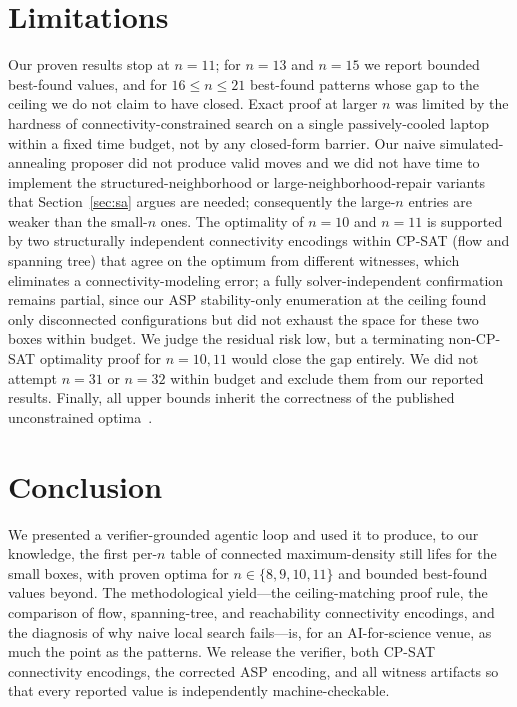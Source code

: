 \documentclass{article}
\begin{document}
\section{Limitations}
\label{sec:limitations}
Our proven results stop at $n=11$; for $n=13$ and $n=15$ we report bounded best-found values, and for $16\le n\le 21$ best-found patterns whose gap to the ceiling we do not claim to have closed. Exact proof at larger $n$ was limited by the hardness of connectivity-constrained search on a single passively-cooled laptop within a fixed time budget, not by any closed-form barrier. Our naive simulated-annealing proposer did not produce valid moves and we did not have time to implement the structured-neighborhood or large-neighborhood-repair variants that Section~\ref{sec:sa} argues are needed; consequently the large-$n$ entries are weaker than the small-$n$ ones. The optimality of $n=10$ and $n=11$ is supported by two structurally independent connectivity encodings within CP-SAT (flow and spanning tree) that agree on the optimum from different witnesses, which eliminates a connectivity-modeling error; a fully solver-independent confirmation remains partial, since our ASP stability-only enumeration at the ceiling found only disconnected configurations but did not exhaust the space for these two boxes within budget. We judge the residual risk low, but a terminating non-CP-SAT optimality proof for $n=10,11$ would close the gap entirely. We did not attempt $n=31$ or $n=32$ within budget and exclude them from our reported results. Finally, all upper bounds inherit the correctness of the published unconstrained optima~\citep{chu2012}.

\section{Conclusion}
\label{sec:conclusion}
We presented a verifier-grounded agentic loop and used it to produce, to our knowledge, the first per-$n$ table of connected maximum-density still lifes for the small boxes, with proven optima for $n\in\{8,9,10,11\}$ and bounded best-found values beyond. The methodological yield---the ceiling-matching proof rule, the comparison of flow, spanning-tree, and reachability connectivity encodings, and the diagnosis of why naive local search fails---is, for an AI-for-science venue, as much the point as the patterns. We release the verifier, both CP-SAT connectivity encodings, the corrected ASP encoding, and all witness artifacts so that every reported value is independently machine-checkable.
\end{document}
